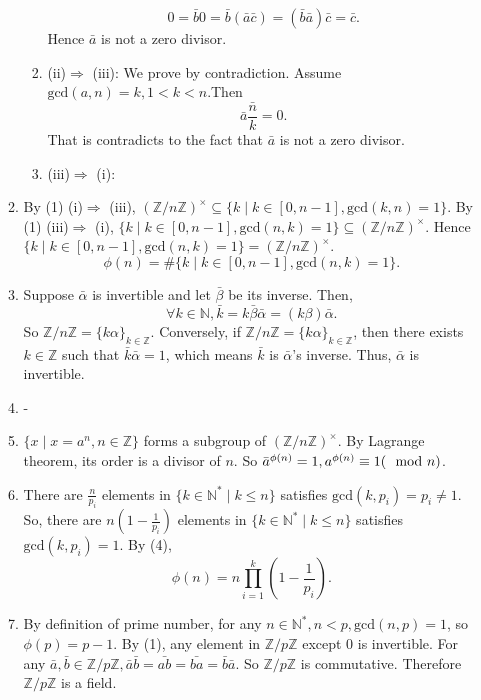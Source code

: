 \documentclass{article}
\newcommand{\NN}{\mathbb{N}}
\newcommand{\ZZ}{\mathbb{Z}}
\begin{document}
\begin{enumerate}
\begin{enumerate}
\begin{enumerate}
                            $$0=\bar{b}0=\bar{b}(\bar{a}\bar{c})=(\bar{b}\bar{a})\bar{c}=\bar{c}.$$
                            Hence $\bar{a}$ is not a zero divisor.
                        \item (ii)$\Rightarrow$ (iii): We prove by contradiction. Assume $\mathrm{gcd}(a,n)=k,1<k<n$.Then
                            $$\bar{a}\bar{\frac{n}{k}}=0.$$
                            That is contradicts to the fact that $\bar{a}$ is not a zero divisor.
                        \item (iii)$\Rightarrow$ (i): 
                    \end{enumerate}
                \item By (1) (i)$\Rightarrow$ (iii), $(\ZZ/n\ZZ)^\times\subseteq\{k\mid k\in [0,n-1], \mathrm{gcd}(k,n)=1\}$.
                        \newline
                        By (1) (iii)$\Rightarrow$ (i), $\{k\mid k\in [0,n-1],\mathrm{gcd}(n,k)=1\}\subseteq (\ZZ/n\ZZ)^\times$.
                        \newline Hence $\{k\mid k\in [0,n-1],\mathrm{gcd}(n,k)=1\}=(\ZZ/n\ZZ)^\times$. 
                        $$\phi(n)=\#\{k\mid k\in [0,n-1],\mathrm{gcd}(n,k)=1\}.$$
                \item  Suppose $\bar{\alpha}$ is invertible and let $\bar{\beta}$ be its inverse. Then, 
                        $$\forall k\in \NN, \bar{k}=k\bar{\beta}\bar{\alpha}=(k\beta)\bar{\alpha}.$$
                        So $\ZZ/n\ZZ=\{k\alpha\}_{k\in\ZZ}$.
                        \newline
                        Conversely, if $\ZZ/n\ZZ=\{k\alpha\}_{k\in\ZZ}$, then there exists $k\in\ZZ$ such that $\bar{k}\bar{\alpha}=1$, which means $\bar{k}$ is $\bar{\alpha}$'s inverse. Thus, $\bar{\alpha}$ is invertible.
                \item -
                \item $\{x\mid x=a^n,n\in\ZZ\}$ forms a subgroup of $(\ZZ/n\ZZ)^\times$. By Lagrange theorem, its order is a divisor of $n$. So $\bar{a}^{\phi(n)}=1, a^{\phi(n)}\equiv 1 (\mathrm{\mod} n )$.
                \item There are $\frac{n}{p_i}$ elements in $\{k\in\NN^{*}\mid k\le n\}$ satisfies $\mathrm{gcd}(k,p_i)=p_i\not=1$. So, there are $n(1-\frac{1}{p_i})$ elements in $\{k\in\NN^{*}\mid k\le n\}$ satisfies $\mathrm{gcd}(k,p_i)=1$. By (4),
                        $$\phi(n)=n\prod_{i=1}^{k}(1-\frac{1}{p_i}).$$
                \item By definition of prime number, for any $n\in \NN^{*}, n<p, \mathrm{gcd}(n,p)=1$, so $\phi(p)=p-1.$ By (1), any element in $\ZZ/p\ZZ$ except $0$ is invertible. For any $\bar{a},\bar{b}\in \ZZ/p\ZZ, \bar{a}\bar{b}=\bar{ab}=\bar{ba}=\bar{b}\bar{a}.$ So $\ZZ/p\ZZ$ is commutative. Therefore $\ZZ/p\ZZ$ is a field. 
        \end{enumerate}
\end{enumerate}
\end{document}
